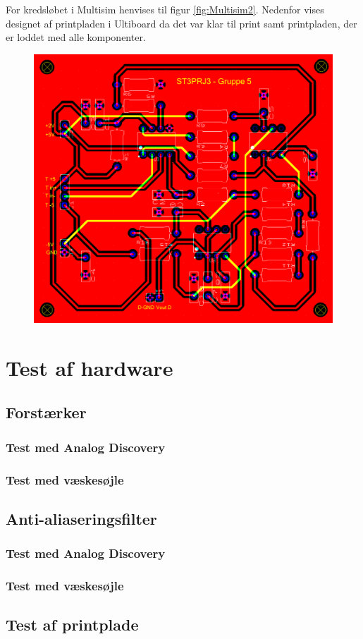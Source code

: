 For kredsløbet i Multisim henvises til figur \vref{fig:Multisim2}. Nedenfor vises designet af printpladen i Ultiboard da det var klar til print samt printpladen, der er loddet med alle komponenter.

\begin{figure}[h!]
	\centering
	\includegraphics[width=0.5\linewidth]{../Rapport/Implementering_og_test/Hardware/Ultiboard}
	\caption[Print i Ultiboard]{}
	\label{fig:ultiboard1}
\end{figure}




\section{Test af hardware}
\subsection{Forstærker}

\subsubsection{Test med Analog Discovery}
\subsubsection{Test med væskesøjle}
\subsection{Anti-aliaseringsfilter}
\subsubsection{Test med Analog Discovery}
\subsubsection{Test med væskesøjle}
\subsection{Test af printplade}
